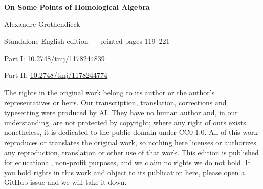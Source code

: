 \documentclass[10pt,twoside,openany]{book}
\begin{document}
\raggedbottom
\begin{titlepage}
\centering
\vspace*{0.18\textheight}
{\Huge\bfseries On Some Points of Homological Algebra\par}
\vspace{1.5em}
{\Large Alexandre Grothendieck\par}
\vspace{2.5em}
  {\large Standalone English edition — printed pages 119--221\par}
\vfill
{\TohokuAuthorityLine\par}
{Part I: \href{https://doi.org/10.2748/tmj/1178244839}{10.2748/tmj/1178244839}\par}
{Part II: \href{https://doi.org/10.2748/tmj/1178244774}{10.2748/tmj/1178244774}\par}
\vspace{1.5em}
{\small\raggedright The rights in the original work belong to its author or the author's representatives or heirs. Our transcription, translation, corrections and typesetting were produced by AI. They have no human author and, in our understanding, are not protected by copyright; where any right of ours exists nonetheless, it is dedicated to the public domain under CC0 1.0. All of this work reproduces or translates the original work, so nothing here licenses or authorizes any reproduction, translation or other use of that work. This edition is published for educational, non-profit purposes, and we claim no rights we do not hold. If you hold rights in this work and object to its publication here, please open a GitHub issue and we will take it down.\par}
\end{titlepage}
\end{document}
